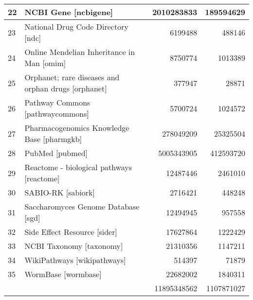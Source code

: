 \begin{table}[]
\begin{tabular}{|l|l|r|r|}
  22 & NCBI Gene [ncbigene] & 2010283833 & 189594629\\\hline
  23 & National Drug Code Directory [ndc] & 6199488 & 488146\\\hline
  24 & Online Mendelian Inheritance in Man [omim] & 8750774 & 1013389\\\hline
  25 & Orphanet; rare diseases and orphan drugs [orphanet] & 377947 & 28871\\\hline
  26 & Pathway Commons [pathwaycommons] & 5700724 & 1024572\\\hline
  27 & Pharmacogenomics Knowledge Base [pharmgkb] & 278049209 & 25325504\\\hline
  28 & PubMed [pubmed] & 5005343905 & 412593720\\\hline
  29 & Reactome - biological pathways [reactome] & 12487446 & 2461010\\\hline
  30 & SABIO-RK [sabiork] & 2716421 & 448248\\\hline
  31 & Saccharomyces Genome Database [sgd] & 12494945 & 957558\\\hline
  32 & Side Effect Resource [sider] & 17627864 & 1222429\\\hline
  33 & NCBI Taxonomy [taxonomy] & 21310356 & 1147211\\\hline
  34 & WikiPathways [wikipathways] & 514397 & 71879\\\hline
  35 & WormBase [wormbase] & 22682002 & 1840311\\\hline
  & & 11895348562 & 1107871027 \\\hline
\end{tabular}
\end{table}
